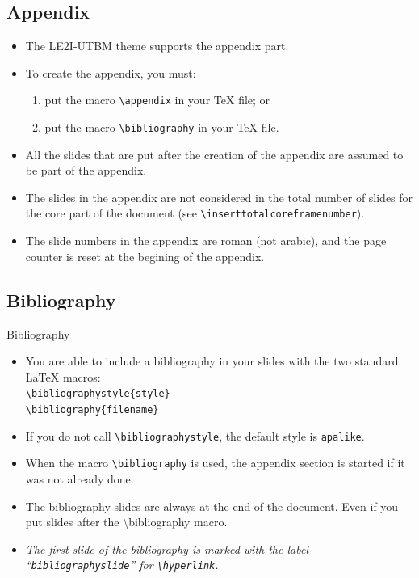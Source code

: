 \documentclass[english,sectioncirclenumberstyle]{le2iutbmbeamer}
\begin{document}
\subsection{Appendix}

\begin{frame}{\subsecname}
	\begin{itemize}
	\item The LE2I-UTBM theme supports the appendix part.
	\vspace{1em}
	\item To create the appendix, you must:
		\begin{enumerate}
		\item put the macro \texttt{{\textbackslash}appendix} in your {\TeX} file; or
		\item put the macro \texttt{{\textbackslash}bibliography} in your {\TeX} file.
		\end{enumerate}
	\vspace{1em}
	\item All the slides that are put after the creation of the appendix are assumed to be part of the appendix.
	\item The slides in the appendix are not considered in the total number of slides for the core part of the document (see \texttt{{\textbackslash}inserttotalcoreframenumber}).
	\item The slide numbers in the appendix are roman (not arabic), and the page counter is reset at the begining of the appendix.
	\end{itemize}
\end{frame}

\subsection{Bibliography}

\begin{frame}{Bibliography}
	\begin{itemize}
	\item You are able to include a bibliography in your slides with the two standard {\LaTeX} macros: \\
		\texttt{{\textbackslash}bibliographystyle\{style\}} \\
		\texttt{{\textbackslash}bibliography\{filename\}}
	\vspace{1em}
	\item If you do not call \texttt{{\textbackslash}bibliographystyle}, the default style is \texttt{apalike}.
	\vspace{1em}
	\item When the macro \texttt{{\textbackslash}bibliography} is used, the appendix section is started if it was not already done.
	\item The bibliography slides are \alert{always at the end of the document}. Even if you put slides after the {\textbackslash}bibliography macro.
	\item \emph{The first slide of the bibliography is marked with the label ``\texttt{bibliographyslide}'' for \texttt{{\textbackslash}hyperlink}.}
	\end{itemize}
\end{frame}
\end{document}
